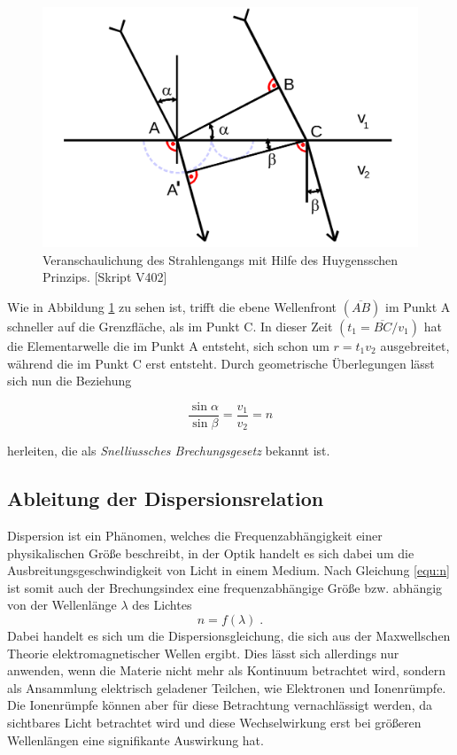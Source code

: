 \begin{figure}
  \centering
  \includegraphics[width=0.6\textheight]{../figures/SBG.png}
  \caption{Veranschaulichung des Strahlengangs mit Hilfe des Huygensschen Prinzips. [Skript V402]}
\label{fig:SBG}
\end{figure}

Wie in Abbildung \ref{fig:SBG} zu sehen ist, trifft die ebene Wellenfront $(\overline{AB})$ im Punkt A schneller auf die Grenzfläche, als im Punkt C. In dieser Zeit $(t_1 = \overline{BC} / v_1)$ hat die Elementarwelle die im Punkt A entsteht, sich schon um $r = t_1v_2$ ausgebreitet, während die im Punkt C erst entsteht.
Durch geometrische Überlegungen lässt sich nun die Beziehung

\begin{equation}
  \frac{\sin{\alpha}}{\sin{\beta}} = \frac{v_1}{v_2} = n
\end{equation}

herleiten, die als \emph{Snelliussches Brechungsgesetz} bekannt ist.

\subsection{Ableitung der Dispersionsrelation}
Dispersion ist ein Phänomen, welches die Frequenzabhängigkeit einer physikalischen Größe beschreibt, in der Optik handelt es sich dabei um die Ausbreitungsgeschwindigkeit von Licht in einem Medium. Nach Gleichung \eqref{equ:n} ist somit auch der Brechungsindex eine frequenzabhängige Größe bzw. abhängig von der Wellenlänge $\lambda$ des Lichtes
\begin{equation}
    n = f(\lambda) \; .
\end{equation}
Dabei handelt es sich um die Dispersionsgleichung, die sich aus der Maxwellschen Theorie elektromagnetischer Wellen ergibt. Dies lässt sich allerdings nur anwenden, wenn die Materie nicht mehr als Kontinuum betrachtet wird, sondern als Ansammlung elektrisch geladener Teilchen, wie Elektronen und Ionenrümpfe. Die Ionenrümpfe können aber für diese Betrachtung vernachlässigt werden, da sichtbares Licht betrachtet wird und diese Wechselwirkung erst bei größeren Wellenlängen eine signifikante Auswirkung hat.

